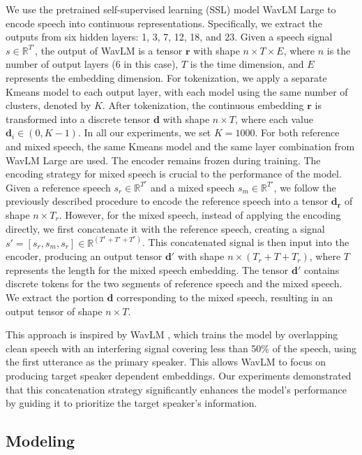 \documentclass[conference]{IEEEtran}
\begin{document}
We use the pretrained self-supervised learning (SSL) model WavLM Large \cite{wavlm} to encode speech into continuous representations. Specifically, we extract the outputs from six hidden layers: 1, 3, 7, 12, 18, and 23. Given a speech signal \(s \in \mathbb{R}^{T'}\), the output of WavLM is a tensor \(\bm{r}\) with shape \(n \times T \times E\), where \(n\) is the number of output layers (6 in this case), \(T\) is the time dimension, and \(E\) represents the embedding dimension. For tokenization, we apply a separate Kmeans model to each output layer, with each model using the same number of clusters, denoted by \(K\). After tokenization, the continuous embedding \(\bm{r}\) is transformed into a discrete tensor \(\bm{d}\) with shape \(n \times T\), where each value \(\bm{d}_{i} \in (0, K-1) \). In all our experiments, we set \(K = 1000\). For both reference and mixed speech, the same Kmeans model and the same layer combination from WavLM Large are used. The encoder remains frozen during training.
The encoding strategy for mixed speech is crucial to the performance of the model. Given a reference speech \(s_r \in \mathbb{R}^{T^r}\) and a mixed speech \(s_m \in \mathbb{R}^{T'}\), we follow the previously described procedure to encode the reference speech into a tensor \(\bm{d_r}\) of shape \(n \times T_r\). However, for the mixed speech, instead of applying the encoding directly, we first concatenate it with the reference speech, creating a signal \(s' = [s_r, s_m, s_r] \in \mathbb{R}^{(T^r + T' + T^r)}\). This concatenated signal is then input into the encoder, producing an output tensor \(\bm{d'}\) with shape \(n \times (T_r + T + T_r)\), where \(T\) represents the length for the mixed speech embedding. The tensor \(\bm{d'}\) contains discrete tokens for the two segments of reference speech and the mixed speech. We extract the portion \(\bm{d}\) corresponding to the mixed speech, resulting in an output tensor of shape \(n \times T\).

This approach is inspired by WavLM \cite{wavlm}, which trains the model by overlapping clean speech with an interfering signal covering less than 50\% of the speech, using the first utterance as the primary speaker. This allows WavLM to focus on producing target speaker dependent embeddings. Our experiments demonstrated that this concatenation strategy significantly enhances the model's performance by guiding it to prioritize the target speaker's information.
\subsection{Modeling}
\end{document}
